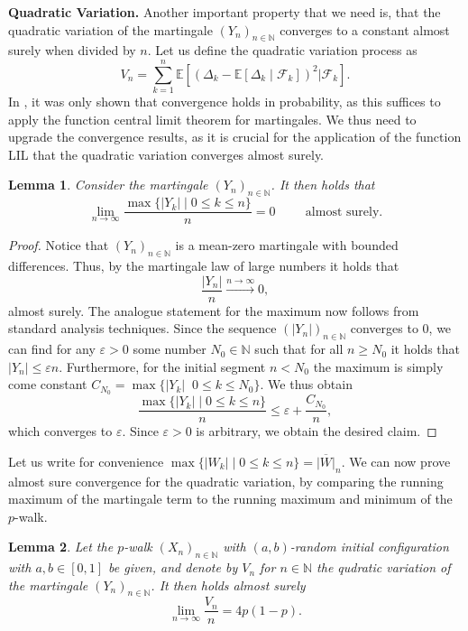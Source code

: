 \documentclass[11pt]{article}
\newtheorem{lemma}{Lemma}[section]
\theoremstyle{remark}
\newcommand{\N}{\mathbb{N}}
\begin{document}
\textbf{Quadratic Variation.} Another important property that we need is, that the quadratic variation of the martingale $(Y_n)_{n\in\N}$ converges to a constant almost surely when divided by $n$. Let us define the quadratic variation process as
$$V_n=\sum_{k=1}^{n}\mathbb{E}\left[\left(\Delta_k-\mathbb{E}[\Delta_k\;|\;\mathcal{F}_k]\right)^2|\mathcal{F}_k\right].$$
In \cite{HLSH18}, it was only shown that convergence holds in probability, as this suffices to apply the function central limit theorem for martingales. We thus need to upgrade the convergence results, as it is crucial for the application of the function LIL that the quadratic variation converges almost surely.
\begin{lemma}\label{lem:martingale-convergence}
    Consider the martingale $(Y_n)_{n\in\N}$. It then holds that
    $$\lim_{n\rightarrow\infty}\frac{\max\{|Y_k|\;|\;0\leq k\leq n\}}{n}=0\hspace{1cm}\text{almost surely}.$$
\end{lemma}
\begin{proof}
    Notice that $(Y_n)_{n\in\N}$ is a mean-zero martingale with bounded differences. Thus, by the martingale law of large numbers it holds that
    $$\frac{|Y_n|}{n}\xrightarrow{n\rightarrow\infty}0,$$
    almost surely. The analogue statement for the maximum now follows from standard analysis techniques. Since the sequence $(|Y_n|)_{n\in\N}$ converges to $0$, we can find for any $\varepsilon>0$ some number $N_0\in\N$ such that for all $n\geq N_0$ it holds that $|Y_n|\leq \varepsilon n$. Furthermore, for the initial segment $n<N_0$ the maximum is simply come constant $C_{N_0}=\max\{|Y_k|\;\;0\leq k\leq N_0\}.$ We thus obtain
    $$\frac{\max\{|Y_k|\;|\;0\leq k\leq n\}}{n}\leq \varepsilon+\frac{C_{N_0}}{n},$$
    which converges to $\varepsilon$. Since $\varepsilon>0$ is arbitrary, we obtain the desired claim.
\end{proof}
Let us write for convenience $\max\{|W_k|\;|\;0\leq k\leq n\}=\overline{|W|}_n.$ We can now prove almost sure convergence for the quadratic variation, by comparing the running maximum of the martingale term to the running maximum and minimum of the $p$-walk.
\begin{lemma}\label{lem:quadratic-variation}
    Let the $p$-walk $(X_n)_{n\in\N}$ with $(a,b)$-random initial configuration with $a,b\in[0,1]$ be given, and denote by $V_n$ for $n\in\N$ the qudratic variation of the martingale $(Y_n)_{n\in\N}$. It then holds almost surely
    $$\lim_{n\rightarrow\infty}\frac{V_n}{n}=4p(1-p).$$
\end{lemma}
\end{document}
